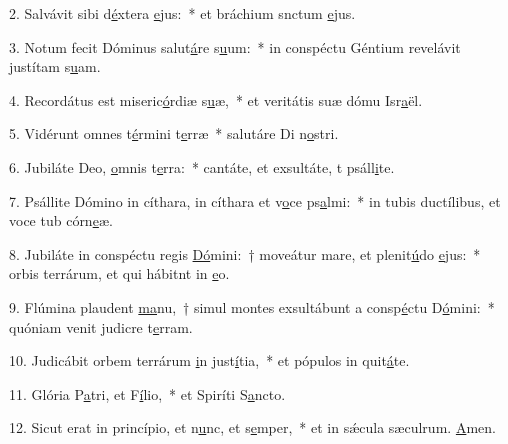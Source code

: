 2. Salvávit sibi d\uline{é}xtera \uline{e}jus:~* et bráchium snctum \uline{e}jus.\par 
3. Notum fecit Dóminus salut\uline{á}re s\uline{u}um:~* in conspéctu Géntium revelávit justítam s\uline{u}am.\par 
4. Recordátus est miseric\uline{ó}rdiæ s\uline{u}æ,~* et veritátis suæ dómu Isr\uline{a}ël.\par 
5. Vidérunt omnes t\uline{é}rmini t\uline{e}rræ~* salutáre Di n\uline{o}stri.\par 
6. Jubiláte Deo, \uline{o}mnis t\uline{e}rra:~* cantáte, et exsultáte, t psáll\uline{i}te.\par 
7. Psállite Dómino in cíthara, in cíthara et v\uline{o}ce ps\uline{a}lmi:~* in tubis ductílibus, et voce tub córn\uline{e}æ.\par 
8. Jubiláte in conspéctu regis \uline{Dó}mini:~† moveátur mare, et plenit\uline{ú}do \uline{e}jus:~* orbis terrárum, et qui hábitnt in \uline{e}o.\par 
9. Flúmina plaudent \uline{ma}nu,~† simul montes exsultábunt a consp\uline{é}ctu D\uline{ó}mini:~* quóniam venit judicre t\uline{e}rram.\par 
10. Judicábit orbem terrárum \uline{i}n just\uline{í}tia,~* et pópulos in quit\uline{á}te.\par 
11. Glória P\uline{a}tri, et F\uline{í}lio,~* et Spiríti S\uline{a}ncto.\par 
12. Sicut erat in princípio, et n\uline{u}nc, et s\uline{e}mper,~* et in sǽcula sæculrum. \uline{A}men.\par 

